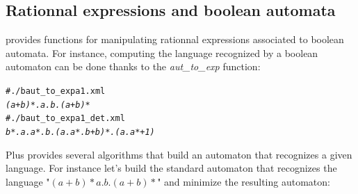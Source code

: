 \subsection{Rationnal expressions and boolean automata}

\Vauc provides functions for manipulating rationnal expressions
associated to boolean automata. For instance, computing the language
recognized by a boolean automaton can be done thanks to the
\textit{aut\_to\_exp} function:
\begin{alltt}
# ./b aut_to_exp a1.xml
\textit{(a+b)*.a.b.(a+b)*}
# ./b aut_to_exp a1_det.xml
\textit{b*.a.a*.b.(a.a*.b+b)*.(a.a*+1)}
\end{alltt}
Plus \Vauc provides several algorithms that build an automaton that
recognizes a given language. For instance let's build the standard
automaton that recognizes the language "$(a+b)*a.b.(a+b)*$" and
minimize the resulting automaton:

